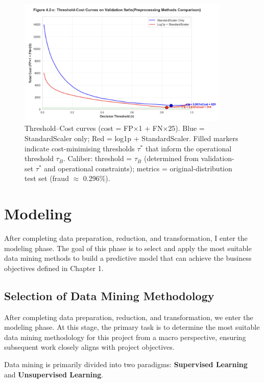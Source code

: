 \documentclass[sigplan,screen]{acmart}
\begin{document}
\begin{figure}[h!]
    \centering
    \includegraphics[width=0.9\textwidth]{4.2c.png}
    \caption{Threshold--Cost curves (cost = FP$\times$1 + FN$\times$25). Blue = StandardScaler only; Red = log1p + StandardScaler. Filled markers indicate cost-minimising thresholds $\tau^*$ that inform the operational threshold $\tau_B$. Caliber: threshold = $\tau_B$ (determined from validation-set $\tau^*$ and operational constraints); metrics = original-distribution test set (fraud $\approx$ 0.296\%).}
    \label{fig:threshold_cost_curve}
\end{figure}

\section{Modeling}

After completing data preparation, reduction, and transformation, I enter the modeling phase. The goal of this phase is to select and apply the most suitable data mining methods to build a predictive model that can achieve the business objectives defined in Chapter 1.

\subsection{Selection of Data Mining Methodology}

After completing data preparation, reduction, and transformation, we enter the modeling phase. At this stage, the primary task is to determine the most suitable data mining methodology for this project from a macro perspective, ensuring subsequent work closely aligns with project objectives.

Data mining is primarily divided into two paradigms: \textbf{Supervised Learning} and \textbf{Unsupervised Learning}.
\end{document}
